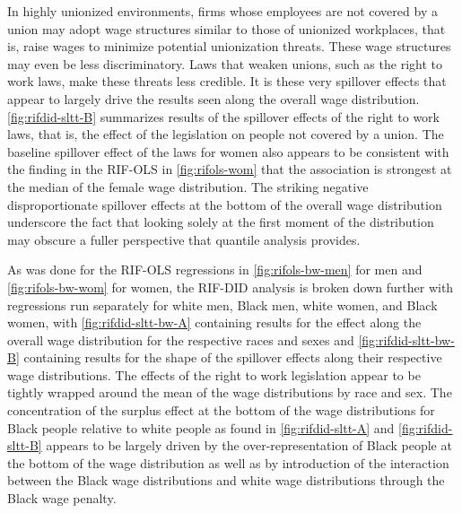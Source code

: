 \documentclass[11pt]{article}
\begin{document}
In highly unionized environments, firms whose employees are not covered by a union may adopt wage structures similar to those of unionized workplaces, that is, raise wages to minimize potential unionization threats. These wage structures may even be less discriminatory. Laws that weaken unions, such as the right to work laws, make these threats less credible. It is these very spillover effects that appear to largely drive the results seen along the overall wage distribution. \autoref{fig:rifdid-sltt-B} summarizes results of the spillover effects of the right to work laws, that is, the effect of the legislation on people not covered by a union. The baseline spillover effect of the laws for women also appears to be consistent with the finding in the RIF-OLS in \autoref{fig:rifols-wom} that the association is strongest at the median of the female wage distribution. The striking negative disproportionate spillover effects at the bottom of the overall wage distribution underscore the fact that looking solely at the first moment of the distribution may obscure a fuller perspective that quantile analysis provides. 

As was done for the RIF-OLS regressions in \autoref{fig:rifols-bw-men} for men and \autoref{fig:rifols-bw-wom} for women, the RIF-DID analysis is broken down further with regressions run separately for white men, Black men, white women, and Black women, with \autoref{fig:rifdid-sltt-bw-A} containing results for the effect along the overall wage distribution for the respective races and sexes and \autoref{fig:rifdid-sltt-bw-B} containing results for the shape of the spillover effects along their respective wage distributions. The effects of the right to work legislation appear to be tightly wrapped around the mean of the wage distributions by race and sex. The concentration of the surplus effect at the bottom of the wage distributions for Black people relative to white people as found in \autoref{fig:rifdid-sltt-A} and \autoref{fig:rifdid-sltt-B} appears to be largely driven by the over-representation of Black people at the bottom of the wage distribution as well as by introduction of the interaction between the Black wage distributions and white wage distributions through the Black wage penalty.
\end{document}
